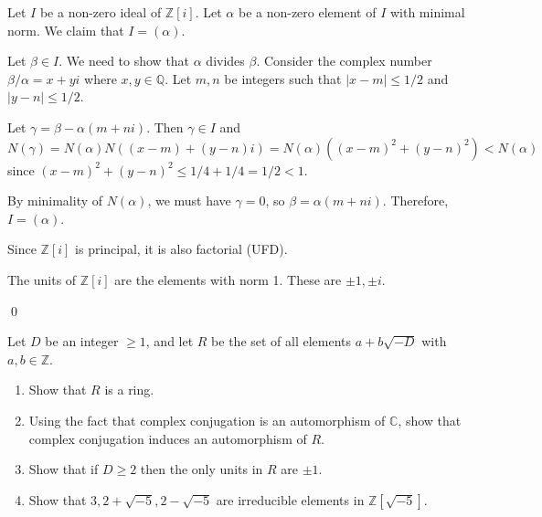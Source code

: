 Let $I$ be a non-zero ideal of $\mathbb{Z}[i]$. Let $\alpha$ be a non-zero element of $I$ with minimal norm. We claim that $I = (\alpha)$.

Let $\beta \in I$. We need to show that $\alpha$ divides $\beta$. Consider the complex number $\beta/\alpha = x + yi$ where $x, y \in \mathbb{Q}$. Let $m, n$ be integers such that $|x - m| \leq 1/2$ and $|y - n| \leq 1/2$.

Let $\gamma = \beta - \alpha(m + ni)$. Then $\gamma \in I$ and $N(\gamma) = N(\alpha)N((x-m) + (y-n)i) = N(\alpha)((x-m)^2 + (y-n)^2) < N(\alpha)$ since $(x-m)^2 + (y-n)^2 \leq 1/4 + 1/4 = 1/2 < 1$.

By minimality of $N(\alpha)$, we must have $\gamma = 0$, so $\beta = \alpha(m + ni)$. Therefore, $I = (\alpha)$.

Since $\mathbb{Z}[i]$ is principal, it is also factorial (UFD).

The units of $\mathbb{Z}[i]$ are the elements with norm 1. These are $\pm 1, \pm i$.


\qed
\begin{problembox}
Let $D$ be an integer $\geq 1$, and let $R$ be the set of all elements $a + b\sqrt{-D}$ with $a, b \in \mathbb{Z}$.
\begin{enumerate}[label=(\alph*)]
    \item Show that $R$ is a ring.
    \item Using the fact that complex conjugation is an automorphism of $\mathbb{C}$, show that complex conjugation induces an automorphism of $R$.
    \item Show that if $D \geq 2$ then the only units in $R$ are $\pm 1$.
    \item Show that $3, 2 + \sqrt{-5}, 2 - \sqrt{-5}$ are irreducible elements in $\mathbb{Z}[\sqrt{-5}]$.
\end{enumerate}
\end{problembox}

